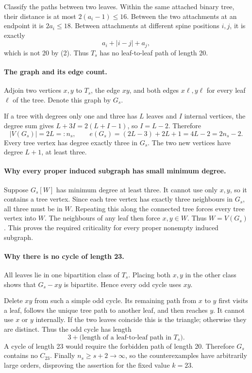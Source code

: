 Classify the paths between two leaves. Within the same attached binary tree, their distance is at most \(2(a_i-1)\leq16\). Between the two attachments at an endpoint it is \(2a_i\leq18\). Between attachments at different spine positions \(i,j\), it is exactly
\[
 a_i+|i-j|+a_j,
\]
which is not 20 by (2). Thus \(T_s\) has no leaf-to-leaf path of length 20.

\paragraph{The graph and its edge count.}
Adjoin two vertices \(x,y\) to \(T_s\), the edge \(xy\), and both edges \(x\ell,y\ell\) for every leaf \(\ell\) of the tree. Denote this graph by \(G_s\).

If a tree with degrees only one and three has \(L\) leaves and \(I\) internal vertices, the degree sum gives
\(L+3I=2(L+I-1)\), so \(I=L-2\). Therefore
\[
 |V(G_s)|=2L=:n_s,
 \qquad
 e(G_s)=(2L-3)+2L+1=4L-2=2n_s-2.
\tag{3}
\]
Every tree vertex has degree exactly three in \(G_s\). The two new vertices have degree \(L+1\), at least three.

\paragraph{Why every proper induced subgraph has small minimum degree.}
Suppose \(G_s[W]\) has minimum degree at least three. It cannot use only \(x,y\), so it contains a tree vertex. Since each tree vertex has exactly three neighbours in \(G_s\), all three must be in \(W\). Repeating this along the connected tree forces every tree vertex into \(W\). The neighbours of any leaf then force \(x,y\in W\). Thus \(W=V(G_s)\). This proves the required criticality for every proper nonempty induced subgraph.

\paragraph{Why there is no cycle of length 23.}
All leaves lie in one bipartition class of \(T_s\). Placing both \(x,y\) in the other class shows that \(G_s-xy\) is bipartite. Hence every odd cycle uses \(xy\).

Delete \(xy\) from such a simple odd cycle. Its remaining path from \(x\) to \(y\) first visits a leaf, follows the unique tree path to another leaf, and then reaches \(y\). It cannot use \(x\) or \(y\) internally. If the two leaves coincide this is the triangle; otherwise they are distinct. Thus the odd cycle has length
\[
 3+\text{(length of a leaf-to-leaf path in }T_s).
\]
A cycle of length 23 would require the forbidden path of length 20. Therefore \(G_s\) contains no \(C_{23}\). Finally \(n_s\geq s+2\to\infty\), so the counterexamples have arbitrarily large orders, disproving the assertion for the fixed value \(k=23\).

